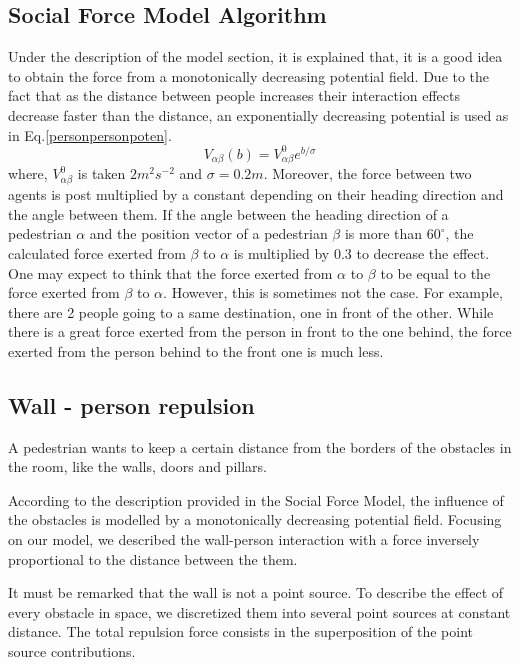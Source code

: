 \documentclass[11pt]{article}
\begin{document}
\subsection{Social Force Model Algorithm}
Under the description of the model section, it is explained that, it is a good idea to obtain the force from a monotonically decreasing potential field. Due to the fact that as the distance between people increases their interaction effects decrease faster than the distance, an exponentially decreasing potential is used as in Eq.\ref{personpersonpoten}.
\begin{equation}
    V_{\alpha\beta}(b)=V^0_{\alpha\beta}e^{b/\sigma}
    \label{personpersonpoten}
\end{equation}
where, $V^0_{\alpha\beta}$ is taken $2m^2s^{-2}$ and $\sigma=0.2m$. Moreover, the force between two agents is post multiplied by a constant depending on their heading direction and the angle between them. If the angle between the heading direction of a pedestrian $\alpha$ and the position vector of a pedestrian $\beta$ is more than $60^\circ$, the calculated force exerted from $\beta$ to $\alpha$ is multiplied by 0.3 to decrease the effect. One may expect to think that the force exerted from $\alpha$ to $\beta$ to be equal to the force exerted from $\beta$ to $\alpha$. However, this is sometimes not the case. For example, there are 2 people going to a same destination, one in front of the other. While there is a great force exerted from the person in front to the one behind, the force exerted from the person behind to the front one is much less.

\subsection{Wall - person repulsion}
A pedestrian wants to keep a certain distance from the borders of the obstacles in the room, like the walls, doors and pillars.

According to the description provided in the Social Force Model, the influence of the obstacles is modelled by a monotonically decreasing potential field. Focusing on our model, we described the wall-person interaction with a force inversely proportional to the distance between the them.

It must be remarked that the wall is not a point source. To describe the effect of every obstacle in space, we discretized them into several point sources at constant distance. The total repulsion force consists in the superposition of the point source contributions.
\end{document}
